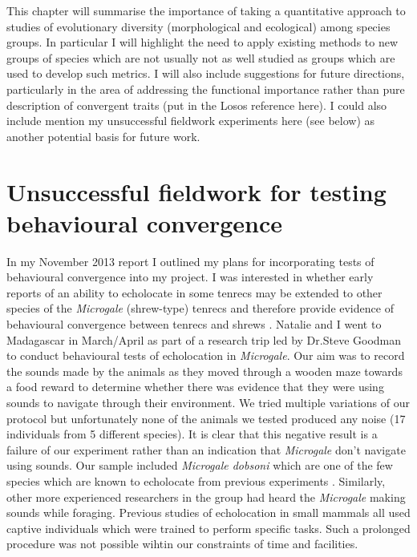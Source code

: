 \documentclass[12pt,a4paper]{article}
\begin{document}
\begin{enumerate}
This chapter will summarise the importance of taking a quantitative approach to studies of evolutionary diversity (morphological and ecological) among species groups. In particular I will highlight the need to apply existing methods to new groups of species which are not usually not as well studied as groups which are used to develop such metrics. I will also include suggestions for future directions, particularly in the area of addressing the functional importance rather than pure description of convergent traits (put in the Losos reference here). I could also include mention my unsuccessful fieldwork experiments here (see below) as another potential basis for future work. 

\end{enumerate}

\section{Unsuccessful fieldwork for testing behavioural convergence}

In my November 2013 report I outlined my plans for incorporating tests of behavioural convergence into my project. I was interested in whether early reports of an ability to echolocate in some tenrecs \citep{Gould1965} may be extended to other species of the \textit{Microgale} (shrew-type) tenrecs and therefore provide evidence of behavioural convergence between tenrecs and shrews \citep{Siemers2009}. Natalie and I went to Madagascar in March/April as part of a research trip led by Dr.Steve Goodman to conduct behavioural tests of echolocation in \textit{Microgale}. Our aim was to record the sounds made by the animals as they moved through a wooden maze towards a food reward to determine whether there was evidence that they were using sounds to navigate through their environment. We tried multiple variations of our protocol but unfortunately none of the animals we tested produced any noise (17 individuals from 5 different species). It is clear that this negative result is a failure of our experiment rather than an indication that \textit{Microgale} don't navigate using sounds. Our sample included \textit{Microgale dobsoni} which are one of the few species which are known to echolocate from previous experiments \citep{Gould1965}. Similarly, other more experienced researchers in the group had heard the \textit{Microgale} making sounds while foraging. Previous studies of echolocation in small mammals \citep{Gould1964, Gould1965, Tomasi1979, Siemers2009} all used captive individuals which were trained to perform specific tasks. Such a prolonged procedure was not possible wihtin our constraints of time and facilities.
\end{document}
